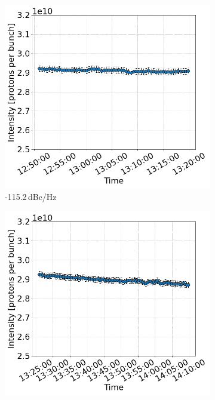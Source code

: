  \begin{figure}[htp]
    \centering
    \begin{subfigure}{.45\textwidth}
        \centering
        \includegraphics[width=.95\linewidth]{images/app_e/intensity_cc_md_16May22_coast_2.png}  
        \caption{-115.2\,dBc/Hz}
    \end{subfigure}
    \begin{subfigure}{.45\textwidth}
        \centering
        \includegraphics[width=.95\linewidth]{images/app_e/intensity_cc_md_16May22_coast_3.png}  

\end{subfigure}
\end{figure}
